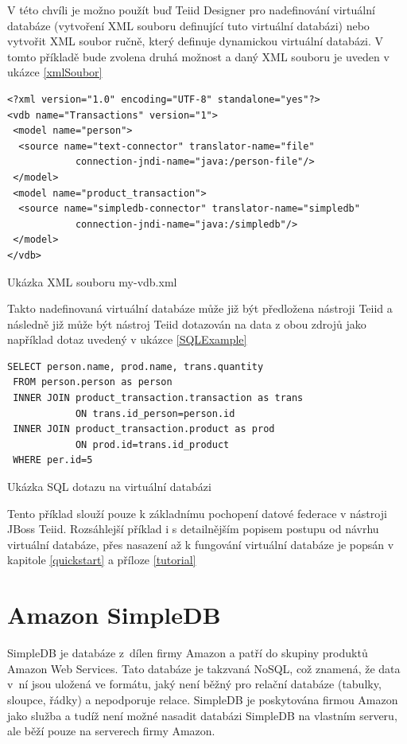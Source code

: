 \documentclass[oneside,12pt]{fithesis2}
\begin{document}
V této chvíli je možno použít buď Teiid Designer pro nadefinování virtuální databáze (vytvoření XML souboru definující tuto virtuální databázi) nebo vytvořit XML soubor ručně, který definuje dynamickou virtuální databázi. V tomto příkladě bude zvolena druhá možnost a daný XML souboru je uveden v ukázce \ref{xmlSoubor}
\begin{ukazka}[h]
\begin{Verbatim}[frame=leftline,fontsize=\small]
<?xml version="1.0" encoding="UTF-8" standalone="yes"?>
<vdb name="Transactions" version="1">
 <model name="person">
  <source name="text-connector" translator-name="file"
            connection-jndi-name="java:/person-file"/>
 </model>
 <model name="product_transaction">
  <source name="simpledb-connector" translator-name="simpledb"
            connection-jndi-name="java:/simpledb"/>
 </model>
</vdb>
\end{Verbatim}
\caption{Ukázka XML souboru my-vdb.xml}
\label{xmlSoubor}
\end{ukazka}

\vspace{150}
Takto nadefinovaná virtuální databáze může již být předložena nástroji Teiid a následně již může být nástroj Teiid dotazován na data z obou zdrojů jako například dotaz uvedený v ukázce \ref{SQLExample}
\begin{ukazka}[h]
\begin{Verbatim}[frame=leftline,fontsize=\small]
 SELECT person.name, prod.name, trans.quantity 
 FROM person.person as person
 INNER JOIN product_transaction.transaction as trans 
            ON trans.id_person=person.id
 INNER JOIN product_transaction.product as prod 
            ON prod.id=trans.id_product
 WHERE per.id=5
\end{Verbatim}
\label{SQLExample}
\caption{Ukázka SQL dotazu na virtuální databázi}
\end{ukazka}

Tento příklad slouží pouze k základnímu pochopení datové federace v nástroji JBoss Teiid. Rozsáhlejší příklad i s detailnějším popisem postupu od návrhu virtuální databáze, přes nasazení až k fungování virtuální databáze je popsán v kapitole \ref{quickstart} a příloze \ref{tutorial}

\chapter{Amazon SimpleDB}
SimpleDB je databáze z~dílen firmy Amazon a patří do skupiny produktů Amazon Web Services. Tato databáze je takzvaná NoSQL, což znamená, že data v~ní jsou uložená ve formátu, jaký není běžný pro relační databáze (tabulky, sloupce, řádky) a nepodporuje relace. SimpleDB je poskytována firmou Amazon jako služba a tudíž není možné nasadit databázi SimpleDB na vlastním serveru, ale běží pouze na serverech firmy Amazon. 
\end{document}
